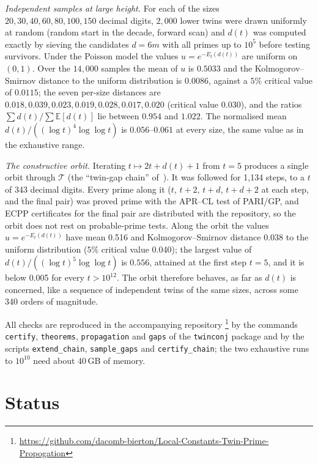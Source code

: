 \documentclass[11pt,a4paper]{article}
\theoremstyle{plain}
\theoremstyle{definition}
\theoremstyle{remark}
\newcommand{\Tset}{\mathcal{T}}
\begin{document}
\emph{Independent samples at large height.}  For each of the sizes
$20,30,40,60,80,100,150$ decimal digits, $2{,}000$ lower twins were drawn
uniformly at random (random start in the decade, forward scan) and $d(t)$
was computed exactly by sieving the candidates $d=6m$ with all primes up to
$10^5$ before testing survivors.  Under the Poisson model the values
$u=e^{-E_t(d(t))}$ are uniform on $(0,1)$.  Over the $14{,}000$ samples the
mean of $u$ is $0.5033$ and the Kolmogorov--Smirnov distance to the uniform
distribution is $0.0086$, against a $5\%$ critical value of $0.0115$; the
seven per-size distances are $0.018,0.039,0.023,0.019,0.028,0.017,0.020$
(critical value $0.030$), and the ratios
$\sum d(t)/\sum\mathbb E[d(t)]$ lie between $0.954$ and $1.022$.  The
normalised mean $d(t)/((\log t)^4\log\log t)$ is $0.056$--$0.061$ at every
size, the same value as in the exhaustive range.

\emph{The constructive orbit.}  Iterating $t\mapsto2t+d(t)+1$ from $t=5$
produces a single orbit through $\Tset$ (the ``twin-gap chain''
of~\cite{BiertonGap}).  It was followed for 1{,}134 steps, to a $t$ of
343 decimal digits.  Every prime along it ($t$, $t+2$, $t+d$,
$t+d+2$ at each step, and the final pair) was proved prime with the APR--CL
test of PARI/GP, and ECPP certificates for the final pair are distributed
with the repository, so the orbit does not rest on probable-prime tests.
Along the orbit the values $u=e^{-E_t(d(t))}$ have mean 0.516 and
Kolmogorov--Smirnov distance 0.038 to the uniform distribution ($5\%$
critical value 0.040); the largest value of
$d(t)/((\log t)^5\log\log t)$ is $0.556$, attained at the first step $t=5$,
and it is below 0.005 for every $t>10^{12}$.  The orbit therefore
behaves, as far as $d(t)$ is concerned, like a sequence of independent
twins of the same sizes, across some 340 orders of magnitude.

All checks are reproduced in the accompanying repository%
\footnote{\url{https://github.com/dacomb-bierton/Local-Constants-Twin-Prime-Propogation}} by the commands
\texttt{certify}, \texttt{theorems}, \texttt{propagation} and \texttt{gaps}
of the \texttt{twinconj} package and by the scripts \texttt{extend\_chain},
\texttt{sample\_gaps} and \texttt{certify\_chain}; the two exhaustive runs
to $10^{10}$ need about $40$\,GB of memory.

\section{Status}
\end{document}
